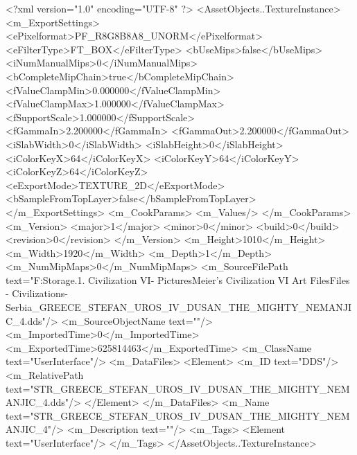 <?xml version="1.0" encoding="UTF-8" ?>
<AssetObjects..TextureInstance>
	<m_ExportSettings>
		<ePixelformat>PF_R8G8B8A8_UNORM</ePixelformat>
		<eFilterType>FT_BOX</eFilterType>
		<bUseMips>false</bUseMips>
		<iNumManualMips>0</iNumManualMips>
		<bCompleteMipChain>true</bCompleteMipChain>
		<fValueClampMin>0.000000</fValueClampMin>
		<fValueClampMax>1.000000</fValueClampMax>
		<fSupportScale>1.000000</fSupportScale>
		<fGammaIn>2.200000</fGammaIn>
		<fGammaOut>2.200000</fGammaOut>
		<iSlabWidth>0</iSlabWidth>
		<iSlabHeight>0</iSlabHeight>
		<iColorKeyX>64</iColorKeyX>
		<iColorKeyY>64</iColorKeyY>
		<iColorKeyZ>64</iColorKeyZ>
		<eExportMode>TEXTURE_2D</eExportMode>
		<bSampleFromTopLayer>false</bSampleFromTopLayer>
	</m_ExportSettings>
	<m_CookParams>
		<m_Values/>
	</m_CookParams>
	<m_Version>
		<major>1</major>
		<minor>0</minor>
		<build>0</build>
		<revision>0</revision>
	</m_Version>
	<m_Height>1010</m_Height>
	<m_Width>1920</m_Width>
	<m_Depth>1</m_Depth>
	<m_NumMipMaps>0</m_NumMipMaps>
	<m_SourceFilePath text="F:\Mod Storage\2.1. Civilization VI\Mods\Archive - Pictures\Sid Meier's Civilization VI Art Files\Art Files - Civilizations\Civilization - Serbia\STR_GREECE_STEFAN_UROS_IV_DUSAN_THE_MIGHTY_NEMANJIC_4.dds"/>
	<m_SourceObjectName text=""/>
	<m_ImportedTime>0</m_ImportedTime>
	<m_ExportedTime>625814463</m_ExportedTime>
	<m_ClassName text="UserInterface"/>
	<m_DataFiles>
		<Element>
			<m_ID text="DDS"/>
			<m_RelativePath text="STR_GREECE_STEFAN_UROS_IV_DUSAN_THE_MIGHTY_NEMANJIC_4.dds"/>
		</Element>
	</m_DataFiles>
	<m_Name text="STR_GREECE_STEFAN_UROS_IV_DUSAN_THE_MIGHTY_NEMANJIC_4"/>
	<m_Description text=""/>
	<m_Tags>
		<Element text="UserInterface"/>
	</m_Tags>
</AssetObjects..TextureInstance>

